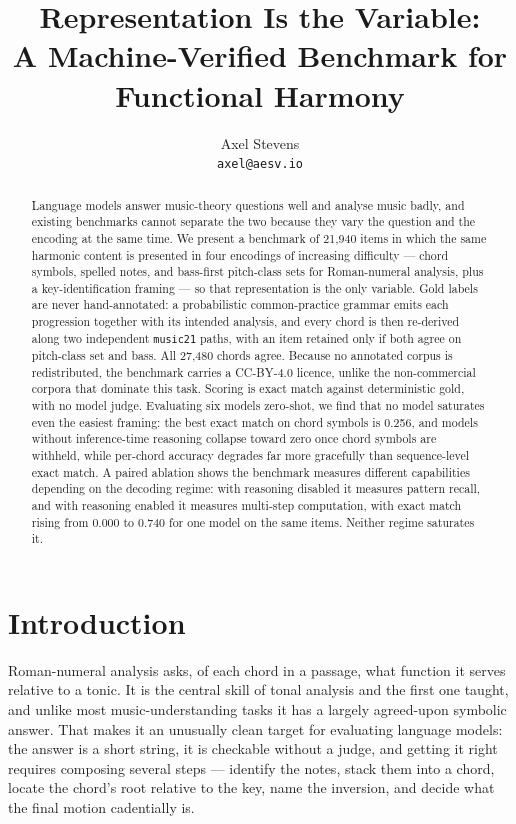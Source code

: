 \documentclass[11pt]{article}
\title{Representation Is the Variable:\\
A Machine-Verified Benchmark for Functional Harmony}
\author{Axel Stevens\\ \texttt{axel@aesv.io}}
\date{}
\begin{document}
\maketitle

\begin{abstract}
Language models answer music-theory questions well and analyse music badly, and
existing benchmarks cannot separate the two because they vary the question and
the encoding at the same time. We present a benchmark of 21{,}940 items in which
the same harmonic content is presented in four encodings of increasing
difficulty --- chord symbols, spelled notes, and bass-first pitch-class sets for
Roman-numeral analysis, plus a key-identification framing --- so that
representation is the only variable. Gold labels are never hand-annotated: a
probabilistic common-practice grammar emits each progression together with its
intended analysis, and every chord is then re-derived along two independent
\texttt{music21} paths, with an item retained only if both agree on pitch-class
set and bass. All 27{,}480 chords agree. Because no annotated corpus is
redistributed, the benchmark carries a CC-BY-4.0 licence, unlike the
non-commercial corpora that dominate this task. Scoring is exact match against
deterministic gold, with no model judge. Evaluating six models zero-shot, we find
that no model saturates even the easiest framing: the best exact match on chord
symbols is 0.256, and models without inference-time reasoning collapse toward
zero once chord symbols are withheld, while per-chord accuracy degrades far more
gracefully than sequence-level exact match. A paired ablation shows the benchmark
measures different capabilities depending on the decoding regime: with reasoning
disabled it measures pattern recall, and with reasoning enabled it measures
multi-step computation, with exact match rising from 0.000 to 0.740 for one model
on the same items. Neither regime saturates it.
\end{abstract}

\section{Introduction}

Roman-numeral analysis asks, of each chord in a passage, what function it serves
relative to a tonic. It is the central skill of tonal analysis and the first one
taught, and unlike most music-understanding tasks it has a largely
agreed-upon symbolic answer. That makes it an unusually clean target for
evaluating language models: the answer is a short string, it is checkable
without a judge, and getting it right requires composing several steps ---
identify the notes, stack them into a chord, locate the chord's root relative to
the key, name the inversion, and decide what the final motion cadentially is.
\end{document}
